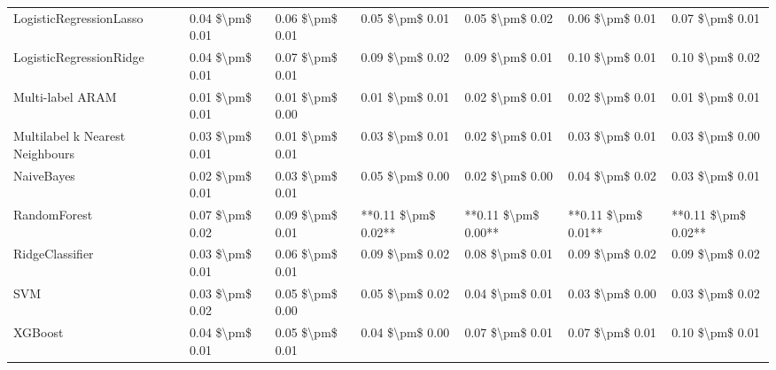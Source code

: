 \begin{tabular}{lllllll}
        LogisticRegressionLasso & 0.04 \$\textbackslash pm\$ 0.01 &           0.06 \$\textbackslash pm\$ 0.01 &       0.05 \$\textbackslash pm\$ 0.01 &        0.05 \$\textbackslash pm\$ 0.02 &                         0.06 \$\textbackslash pm\$ 0.01 &     0.07 \$\textbackslash pm\$ 0.01 \\
        LogisticRegressionRidge & 0.04 \$\textbackslash pm\$ 0.01 &           0.07 \$\textbackslash pm\$ 0.01 &       0.09 \$\textbackslash pm\$ 0.02 &        0.09 \$\textbackslash pm\$ 0.01 &                         0.10 \$\textbackslash pm\$ 0.01 &     0.10 \$\textbackslash pm\$ 0.02 \\
               Multi-label ARAM & 0.01 \$\textbackslash pm\$ 0.01 &           0.01 \$\textbackslash pm\$ 0.00 &       0.01 \$\textbackslash pm\$ 0.01 &        0.02 \$\textbackslash pm\$ 0.01 &                         0.02 \$\textbackslash pm\$ 0.01 &     0.01 \$\textbackslash pm\$ 0.01 \\
Multilabel k Nearest Neighbours & 0.03 \$\textbackslash pm\$ 0.01 &           0.01 \$\textbackslash pm\$ 0.01 &       0.03 \$\textbackslash pm\$ 0.01 &        0.02 \$\textbackslash pm\$ 0.01 &                         0.03 \$\textbackslash pm\$ 0.01 &     0.03 \$\textbackslash pm\$ 0.00 \\
                     NaiveBayes & 0.02 \$\textbackslash pm\$ 0.01 &           0.03 \$\textbackslash pm\$ 0.01 &       0.05 \$\textbackslash pm\$ 0.00 &        0.02 \$\textbackslash pm\$ 0.00 &                         0.04 \$\textbackslash pm\$ 0.02 &     0.03 \$\textbackslash pm\$ 0.01 \\
                   RandomForest & 0.07 \$\textbackslash pm\$ 0.02 &           0.09 \$\textbackslash pm\$ 0.01 &   **0.11 \$\textbackslash pm\$ 0.02** &    **0.11 \$\textbackslash pm\$ 0.00** &                     **0.11 \$\textbackslash pm\$ 0.01** & **0.11 \$\textbackslash pm\$ 0.02** \\
                RidgeClassifier & 0.03 \$\textbackslash pm\$ 0.01 &           0.06 \$\textbackslash pm\$ 0.01 &       0.09 \$\textbackslash pm\$ 0.02 &        0.08 \$\textbackslash pm\$ 0.01 &                         0.09 \$\textbackslash pm\$ 0.02 &     0.09 \$\textbackslash pm\$ 0.02 \\
                            SVM & 0.03 \$\textbackslash pm\$ 0.02 &           0.05 \$\textbackslash pm\$ 0.00 &       0.05 \$\textbackslash pm\$ 0.02 &        0.04 \$\textbackslash pm\$ 0.01 &                         0.03 \$\textbackslash pm\$ 0.00 &     0.03 \$\textbackslash pm\$ 0.02 \\
                        XGBoost & 0.04 \$\textbackslash pm\$ 0.01 &           0.05 \$\textbackslash pm\$ 0.01 &       0.04 \$\textbackslash pm\$ 0.00 &        0.07 \$\textbackslash pm\$ 0.01 &                         0.07 \$\textbackslash pm\$ 0.01 &     0.10 \$\textbackslash pm\$ 0.01 \\
\bottomrule
\end{tabular}
